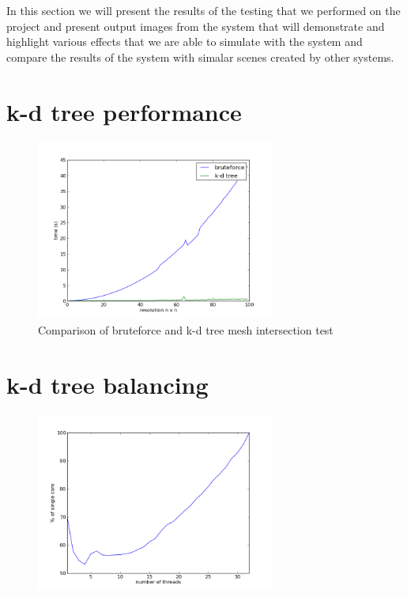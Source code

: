 In this section we will present the results of the testing that we performed on the project and
present output images from the system that will demonstrate and highlight various effects that
we are able to simulate with the system and compare the results of the system with simalar scenes
created by other systems.

\section{k-d tree performance}
\begin{figure}[h]
\centering
\includegraphics[width=0.7\textwidth]{images/results/tri_intersection.png}
\caption{Comparison of bruteforce and k-d tree mesh intersection test}
\label{fig:bf_kd_comp}
\end{figure}

\section{k-d tree balancing}
\begin{figure}[h]
\centering
\includegraphics[width=0.7\textwidth]{./images/results/photon_emission_slow_20.png}
\end{figure}

